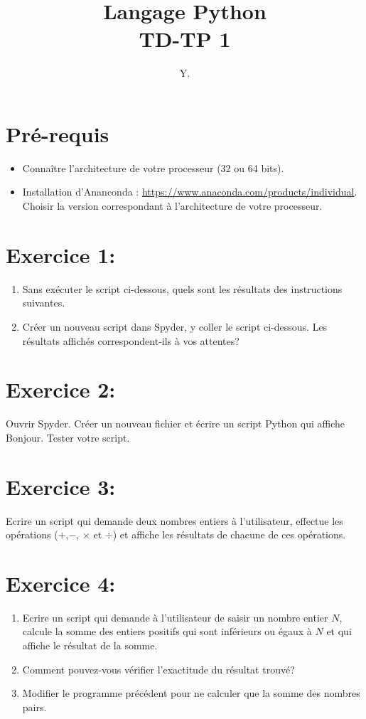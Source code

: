\documentclass[10pt,a4paper]{article}
\title{Langage Python\\
TD-TP 1}
\author{Y. \bsc{Alj}}
\date{}
\begin{document}
\maketitle

\section{Pré-requis}
\begin{itemize}
\item Connaître l'architecture de votre processeur (32 ou 64 bits).
\item Installation d'Ananconda  : \url{https://www.anaconda.com/products/individual}. Choisir la version correspondant à l'architecture de votre processeur.
\end{itemize}

\section*{Exercice 1:}
\begin{enumerate}
\item Sans exécuter le script ci-dessous, quels sont les résultats des instructions suivantes.
\item Créer un nouveau script dans Spyder, y coller le script ci-dessous. Les résultats affichés correspondent-ils à vos attentes?
\end{enumerate}


\begin{minipage}{0.5\textwidth}

\end{minipage}



\section*{Exercice 2:}
Ouvrir Spyder. Créer un nouveau fichier et écrire un script Python qui affiche Bonjour. Tester votre script.

\section*{Exercice 3:}
Ecrire un script qui demande deux nombres entiers à l'utilisateur, effectue les opérations ($+$,$-$, $\times$ et $\div$) et affiche les résultats de chacune de ces opérations.

\newpage
\section*{Exercice 4:}
\begin{enumerate}
\item Ecrire un script qui demande à l'utilisateur de saisir un nombre entier $N$, calcule la somme des entiers positifs qui sont inférieurs ou égaux à $N$ et qui affiche le résultat de la somme.
\item Comment pouvez-vous vérifier l'exactitude du résultat trouvé?
\item Modifier le programme précédent pour ne calculer que la somme des nombres pairs.
\end{enumerate}
\end{document}
